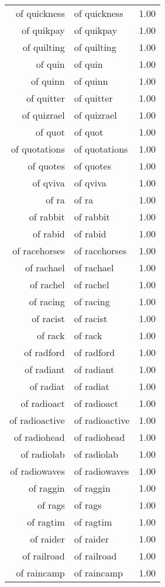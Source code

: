 \begin{table}[ht]
\begin{tabular}{rlr}
  of quickness & of quickness & 1.00 \\ 
  of quikpay & of quikpay & 1.00 \\ 
  of quilting & of quilting & 1.00 \\ 
  of quin & of quin & 1.00 \\ 
  of quinn & of quinn & 1.00 \\ 
  of quitter & of quitter & 1.00 \\ 
  of quizrael & of quizrael & 1.00 \\ 
  of quot & of quot & 1.00 \\ 
  of quotations & of quotations & 1.00 \\ 
  of quotes & of quotes & 1.00 \\ 
  of qviva & of qviva & 1.00 \\ 
  of ra & of ra & 1.00 \\ 
  of rabbit & of rabbit & 1.00 \\ 
  of rabid & of rabid & 1.00 \\ 
  of racehorses & of racehorses & 1.00 \\ 
  of rachael & of rachael & 1.00 \\ 
  of rachel & of rachel & 1.00 \\ 
  of racing & of racing & 1.00 \\ 
  of racist & of racist & 1.00 \\ 
  of rack & of rack & 1.00 \\ 
  of radford & of radford & 1.00 \\ 
  of radiant & of radiant & 1.00 \\ 
  of radiat & of radiat & 1.00 \\ 
  of radioact & of radioact & 1.00 \\ 
  of radioactive & of radioactive & 1.00 \\ 
  of radiohead & of radiohead & 1.00 \\ 
  of radiolab & of radiolab & 1.00 \\ 
  of radiowaves & of radiowaves & 1.00 \\ 
  of raggin & of raggin & 1.00 \\ 
  of rags & of rags & 1.00 \\ 
  of ragtim & of ragtim & 1.00 \\ 
  of raider & of raider & 1.00 \\ 
  of railroad & of railroad & 1.00 \\ 
  of raincamp & of raincamp & 1.00 \\ 

\end{tabular}
\end{table}
